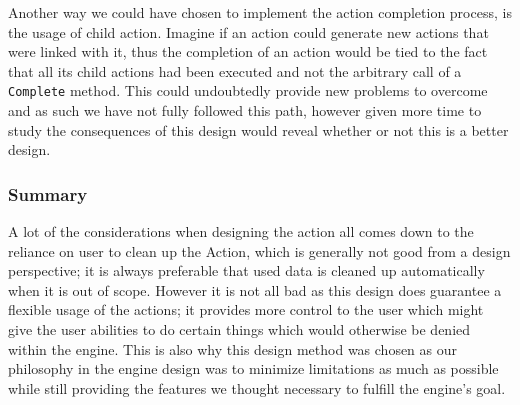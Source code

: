 Another way we could have chosen to implement the action completion
process, is the usage of child action. Imagine if an action could
generate new actions that were linked with it, thus the completion
of an action would be tied to the fact that all its child actions
had been executed and not the arbitrary call of a \texttt{Complete}
method. This could undoubtedly provide new problems to overcome and
as such we have not fully followed this path, however given more time
to study the consequences of this design would reveal whether or not
this is a better design. 


\subsubsection*{Summary}

A lot of the considerations when designing the action all comes down
to the reliance on user to clean up the Action, which is generally
not good from a design perspective; it is always preferable that used
data is cleaned up automatically when it is out of scope. However
it is not all bad as this design does guarantee a flexible usage of
the actions; it provides more control to the user which might give
the user abilities to do certain things which would otherwise be denied
within the engine. This is also why this design method was chosen
as our philosophy in the engine design was to minimize limitations
as much as possible while still providing the features we thought
necessary to fulfill the engine's goal.
